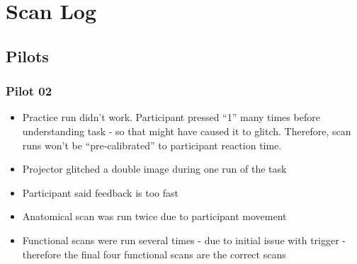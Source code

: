 \documentclass[
]{book}
\providecommand{\tightlist}{%
  \setlength{\itemsep}{0pt}\setlength{\parskip}{0pt}}
\begin{document}
\hypertarget{scan-log}{%
\chapter{Scan Log}\label{scan-log}}

\hypertarget{pilots}{%
\section{Pilots}\label{pilots}}

\hypertarget{pilot-02}{%
\subsection{Pilot 02}\label{pilot-02}}

\begin{itemize}
\tightlist
\item
  Practice run didn't work. Participant pressed ``1'' many times before understanding task - so that might have caused it to glitch. Therefore, scan runs won't be ``pre-calibrated'' to participant reaction time.
\item
  Projector glitched a double image during one run of the task
\item
  Participant said feedback is too fast
\item
  Anatomical scan was run twice due to participant movement
\item
  Functional scans were run several times - due to initial issue with trigger - therefore the final four functional scans are the correct scans
\end{itemize}

  
\end{document}
